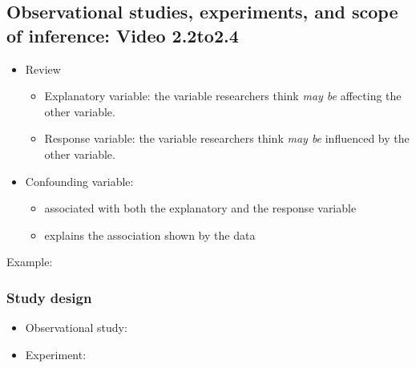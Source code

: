 \documentclass[
]{report}
\providecommand{\tightlist}{%
  \setlength{\itemsep}{0pt}\setlength{\parskip}{0pt}}
\begin{document}
\subsection*{Observational studies, experiments, and scope of inference: Video 2.2to2.4}\label{observational-studies-experiments-and-scope-of-inference-video-2.2to2.4}

\begin{itemize}
\item
  Review

  \begin{itemize}
  \item
    Explanatory variable: the variable researchers think \emph{may be} affecting the other variable.
  \item
    Response variable: the variable researchers think \emph{may be} influenced by the other variable.
  \end{itemize}
\item
  Confounding variable:

  \begin{itemize}
  \tightlist
  \item
    associated with both the explanatory and the response variable
  \item
    explains the association shown by the data
  \end{itemize}
\end{itemize}

Example:

\vspace{0.8in}

\subsubsection*{Study design}\label{study-design}

\begin{itemize}
\tightlist
\item
  Observational study:
\end{itemize}

\vspace{0.5in}

\begin{itemize}
\tightlist
\item
  Experiment:
\end{itemize}

\vspace{0.5in}
\end{document}
